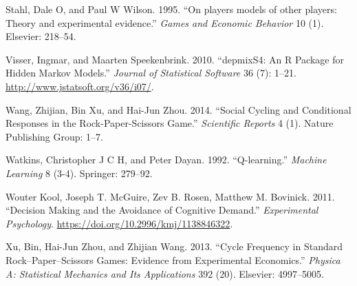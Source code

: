 \documentclass[smallextended]{svjour3}       %
\begin{document}
\leavevmode\hypertarget{ref-stahl1995players}{}%
Stahl, Dale O, and Paul W Wilson. 1995. ``On players models of other
players: Theory and experimental evidence.'' \emph{Games and Economic
Behavior} 10 (1). Elsevier: 218--54.

\leavevmode\hypertarget{ref-R-depmixS4}{}%
Visser, Ingmar, and Maarten Speekenbrink. 2010. ``depmixS4: An R Package
for Hidden Markov Models.'' \emph{Journal of Statistical Software} 36
(7): 1--21. \url{http://www.jstatsoft.org/v36/i07/}.

\leavevmode\hypertarget{ref-wang2014social}{}%
Wang, Zhijian, Bin Xu, and Hai-Jun Zhou. 2014. ``Social Cycling and
Conditional Responses in the Rock-Paper-Scissors Game.''
\emph{Scientific Reports} 4 (1). Nature Publishing Group: 1--7.

\leavevmode\hypertarget{ref-watkins1992q}{}%
Watkins, Christopher J C H, and Peter Dayan. 1992. ``Q-learning.''
\emph{Machine Learning} 8 (3-4). Springer: 279--92.

\leavevmode\hypertarget{ref-Kool_2011}{}%
Wouter Kool, Joseph T. McGuire, Zev B. Rosen, Matthew M. Bovinick. 2011.
``Decision Making and the Avoidance of Cognitive Demand.''
\emph{Experimental Psychology}.
\url{https://doi.org/10.2996/kmj/1138846322}.

\leavevmode\hypertarget{ref-xu2013cycle}{}%
Xu, Bin, Hai-Jun Zhou, and Zhijian Wang. 2013. ``Cycle Frequency in
Standard Rock--Paper--Scissors Games: Evidence from Experimental
Economics.'' \emph{Physica A: Statistical Mechanics and Its
Applications} 392 (20). Elsevier: 4997--5005.




\end{document}
